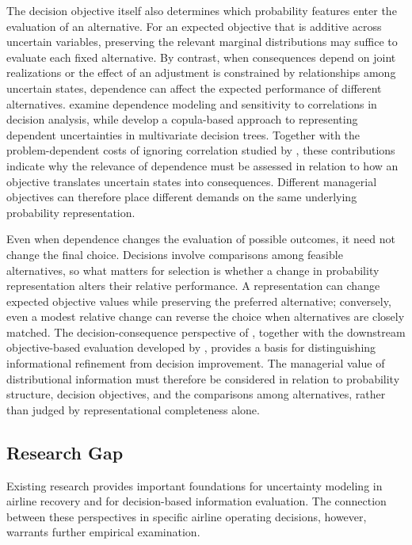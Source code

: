 The decision objective itself also determines which probability features enter the evaluation of an alternative. For an expected objective that is additive across uncertain variables, preserving the relevant marginal distributions may suffice to evaluate each fixed alternative. By contrast, when consequences depend on joint realizations or the effect of an adjustment is constrained by relationships among uncertain states, dependence can affect the expected performance of different alternatives. \citet{clemenReillyCorrelationsCopulas1999} examine dependence modeling and sensitivity to correlations in decision analysis, while \citet{wangDyerCopulasDecisionTrees2012} develop a copula-based approach to representing dependent uncertainties in multivariate decision trees. Together with the problem-dependent costs of ignoring correlation studied by \citet{agrawalPriceCorrelations2012}, these contributions indicate why the relevance of dependence must be assessed in relation to how an objective translates uncertain states into consequences. Different managerial objectives can therefore place different demands on the same underlying probability representation.

Even when dependence changes the evaluation of possible outcomes, it need not change the final choice. Decisions involve comparisons among feasible alternatives, so what matters for selection is whether a change in probability representation alters their relative performance. A representation can change expected objective values while preserving the preferred alternative; conversely, even a modest relative change can reverse the choice when alternatives are closely matched. The decision-consequence perspective of \citet{howardInformationValueTheory1966}, together with the downstream objective-based evaluation developed by \citet{elmachtoubGrigasSmartPredictOptimize2022}, provides a basis for distinguishing informational refinement from decision improvement. The managerial value of distributional information must therefore be considered in relation to probability structure, decision objectives, and the comparisons among alternatives, rather than judged by representational completeness alone.

\subsection{Research Gap}
\label{subsec:rw_gap}

Existing research provides important foundations for uncertainty modeling in airline recovery and for decision-based information evaluation. The connection between these perspectives in specific airline operating decisions, however, warrants further empirical examination.

